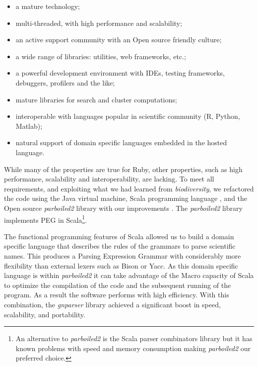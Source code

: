 \documentclass{bmcart}
\begin{document}
\begin{itemize}

    \item a mature technology;

    \item multi-threaded, with high performance and scalability;

    \item an active support community with an Open source friendly culture;

    \item a wide range of libraries: utilities, web frameworks, etc.;

    \item a powerful development environment with IDEs, testing frameworks,
      debuggers, profilers and the like;

    \item mature libraries for search and cluster computations;

    \item interoperable with languages popular in scientific community (R,
      Python, Matlab);

    \item natural support of domain specific languages embedded in the hosted
      language.

\end{itemize}

While many of the properties are true for Ruby, other properties, such as high performance, scalability and interoperability, are lacking. To meet all requirements, and exploiting what we had learned from \textit{biodiversity}, we refactored the code using the Java virtual machine, Scala programming language \cite{odersky2004overview}, and the Open source \textit{parboiled2} library \cite{parboiled2, myltsev-parboiled2} with our improvements \cite{parboiled2-gna}. The \textit{parboiled2} library implements PEG in Scala\footnote{An alternative to \textit{parboiled2} is the Scala parser combinators library \cite{moors2008parser} but it has known problems with speed and memory consumption making \textit{parboiled2} our preferred choice.}.

The functional programming features of Scala allowed us to build a domain specific language that describes the rules of the grammars to parse scientific names. This produces a Parsing Expression Grammar with considerably more flexibility than external lexers such as Bison or Yacc. As this domain specific language is within \textit{parboiled2} it can take advantage of the Macro capacity of Scala \cite{Burmako:2013:SML:2489837.2489840} to optimize the compilation of the code and the subsequent running of the program. As a result the software performs with high efficiency. With this combination, the \textit{gnparser} library achieved a significant boost in speed, scalability, and portability.
\end{document}
